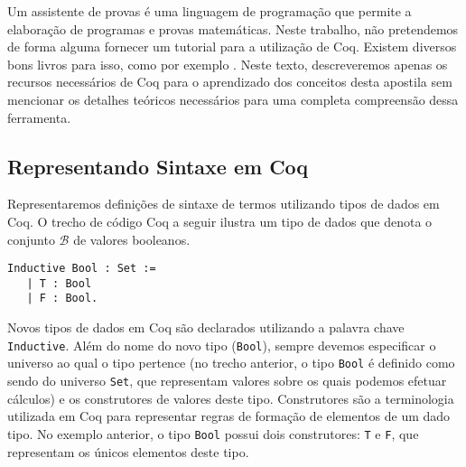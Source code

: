 Um assistente de provas \'e uma linguagem de programa\c{c}\~ao que permite a elabora\c{c}\~ao de programas e provas matem\'aticas.
Neste trabalho, n\~ao pretendemos de forma alguma fornecer um tutorial para a utiliza\c{c}\~ao de Coq. Existem diversos bons livros
para isso, como por exemplo \cite{coqart,Pierce12,Coqrefman}. Neste texto, descreveremos apenas os recursos necess\'arios de Coq para
o aprendizado dos conceitos desta apostila sem mencionar os detalhes te\'oricos necess\'arios para uma completa compreens\~ao dessa ferramenta.

\subsection{Representando Sintaxe em Coq}

Representaremos defini\c{c}\~oes de sintaxe de termos utilizando tipos de dados em Coq. O trecho de c\'odigo Coq a seguir ilustra um
tipo de dados que denota o conjunto $\mathcal{B}$ de valores booleanos.

\begin{lstlisting}
Inductive Bool : Set :=
   | T : Bool
   | F : Bool.
\end{lstlisting}

Novos tipos de dados em Coq s\~ao declarados utilizando a palavra chave \texttt{Inductive}. Al\'em do nome do novo tipo (\texttt{Bool}), sempre
devemos especificar o universo ao qual o tipo pertence (no trecho anterior, o tipo \texttt{Bool} \'e definido como sendo do universo 
\texttt{Set}, que representam valores sobre os quais podemos efetuar c\'alculos) e os construtores de valores deste tipo. Construtores s\~ao
a terminologia utilizada em Coq para representar regras de forma\c{c}\~ao de elementos de um dado tipo. No exemplo anterior, o tipo \texttt{Bool}
possui dois construtores: \texttt{T} e \texttt{F}, que representam os \'unicos elementos deste tipo.

